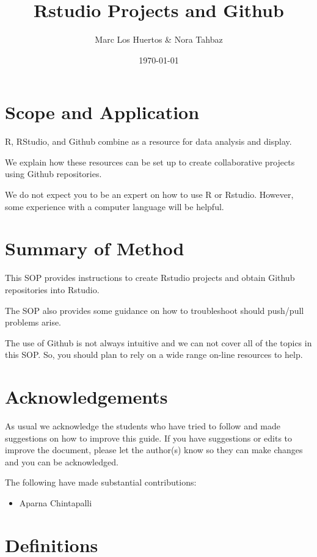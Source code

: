 \documentclass[12pt]{../SOP4_alpha}\usepackage[]{graphicx}\usepackage[]{color}
\author{Marc Los Huertos \& Nora Tahbaz}
\title{Rstudio Projects and Github}
\date{\today}
\begin{document}
\maketitle

\section{Scope and Application}

\NP R, RStudio, and Github combine as a resource for data analysis and display.

\NP We explain how these resources can be set up to create collaborative projects using Github repositories. 

\NP We do not expect you to be an expert on how to use R or Rstudio. However, some experience with a computer language will be helpful. 

\section{Summary of Method}

\NP This SOP provides instructions to create Rstudio projects and obtain Github repositories into Rstudio. 

\NP The SOP also provides some guidance on how to troubleshoot should push/pull problems arise.

\NP The use of Github is not always intuitive and we can not cover all of the topics in this SOP. So, you should plan to rely on a wide range on-line resources to help.

\tableofcontents

\newpage

\section{Acknowledgements}

As usual we acknowledge the students who have tried to follow and made suggestions on how to improve this guide. If you have suggestions or edits to improve the document, please let the author(s) know so they can make changes and you can be acknowledged.

The following have made substantial contributions:

\begin{itemize}
\item Aparna Chintapalli
\end{itemize}

\section{Definitions}
\end{document}
